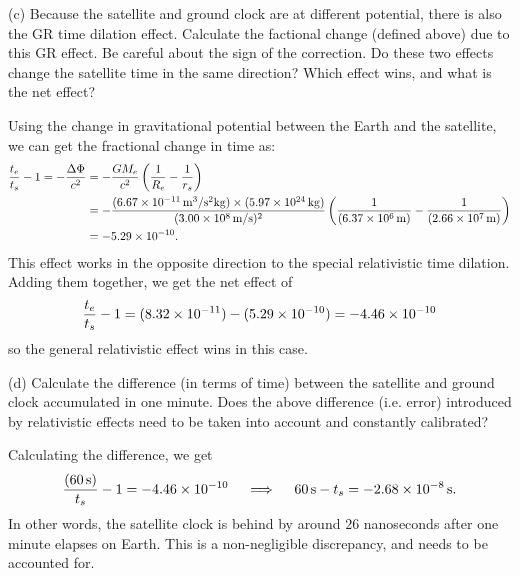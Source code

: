 \documentclass{../../templates/lkx_pset}
\begin{document}
\begin{parts}
	\begin{part}{(c)}
		Because the satellite and ground clock are at different potential, there is also the GR time dilation effect. Calculate the factional change (defined above) due to this GR effect. Be careful about the sign of the correction. Do these two effects change the satellite time in the same direction? Which effect wins, and what is the net effect?
	\end{part}
  Using the change in gravitational potential between the Earth and the satellite, we can get the fractional change in time as:
  \[
    \begin{aligned}
      \frac{t_e}{t_s} - 1= -\frac{\Delta \Phi}{c^2} 
      &= -\frac{GM_e}{c^2}\left(\frac{1}{R_e} - \frac{1}{r_s}\right) \\
      &= -\frac{(\Gsi{6.67e-11})\times(\kgsi{5.97e24})}{(\mpssi{3.00e8})^2}\left(\frac{1}{(\msi{6.37e6})} - \frac{1}{(\msi{2.66e7})}\right)\\
      &= \unitsi{-5.29e-10}.
    \end{aligned}
  \]
  This effect works in the opposite direction to the special relativistic time dilation. Adding them together, we get the net effect of
  \[
    \frac{t_e}{t_s} - 1 = (\unitsi{8.32e-11}) - (\unitsi{5.29e-10}) = -\unitsi{4.46e-10}
  \]
  so the general relativistic effect wins in this case.

	\begin{part}{(d)}
		Calculate the difference (in terms of time) between the satellite and ground clock accumulated in one minute. Does the above difference (i.e. error) introduced by relativistic effects need to be taken into account and constantly calibrated?
	\end{part}

	Calculating the difference, we get
	\[
    \frac{(\ssi{60})}{t_s} - 1 = -\unitsi{4.46e-10} \quad\implies\quad \ssi{60} - t_s = -\ssi{2.68e-8}.
	\]
	In other words, the satellite clock is behind by around $26$ nanoseconds after one minute elapses on Earth. This is a non-negligible discrepancy, and needs to be accounted for.
\end{parts}
\end{document}
